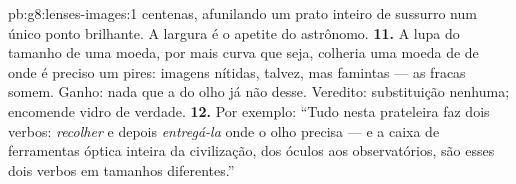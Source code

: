 \begin{solution}{pb:g8:lenses-images:1}
centenas, afunilando um prato inteiro de sussurro num único ponto
brilhante. A largura é o apetite do astrônomo.
\textbf{11.} A lupa do tamanho de uma moeda, por mais curva que seja,
colheria uma moeda de  de  onde é preciso um pires:
imagens nítidas, talvez, mas famintas --- as  fracas somem.
Ganho: nada que a  do olho já não desse. Veredito: substituição
nenhuma; encomende vidro de verdade.
\textbf{12.} Por exemplo: ``Tudo nesta prateleira faz dois verbos:
\emph{recolher}  e depois \emph{entregá-la} onde o olho precisa
--- e a caixa de ferramentas óptica inteira da civilização, dos
óculos aos observatórios, são esses dois verbos em tamanhos
diferentes.''
\end{solution}
